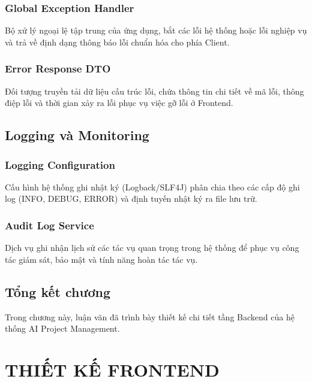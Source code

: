 \documentclass[12pt,a4paper]{report}
\begin{document}
\subsection{Global Exception Handler}

Bộ xử lý ngoại lệ tập trung của ứng dụng, bắt các lỗi hệ thống hoặc lỗi nghiệp vụ và trả về định dạng thông báo lỗi chuẩn hóa cho phía Client.

\subsection{Error Response DTO}

Đối tượng truyền tải dữ liệu cấu trúc lỗi, chứa thông tin chi tiết về mã lỗi, thông điệp lỗi và thời gian xảy ra lỗi phục vụ việc gỡ lỗi ở Frontend.

\section{Logging và Monitoring}

\subsection{Logging Configuration}

Cấu hình hệ thống ghi nhật ký (Logback/SLF4J) phân chia theo các cấp độ ghi log (INFO, DEBUG, ERROR) và định tuyến nhật ký ra file lưu trữ.

\subsection{Audit Log Service}

Dịch vụ ghi nhận lịch sử các tác vụ quan trọng trong hệ thống để phục vụ công tác giám sát, bảo mật và tính năng hoàn tác tác vụ.

\section{Tổng kết chương}


Trong chương này, luận văn đã trình bày thiết kế chi tiết tầng Backend của hệ thống AI Project Management.

\chapter{THIẾT KẾ FRONTEND}
\label{chap:frontend_design}
\end{document}
